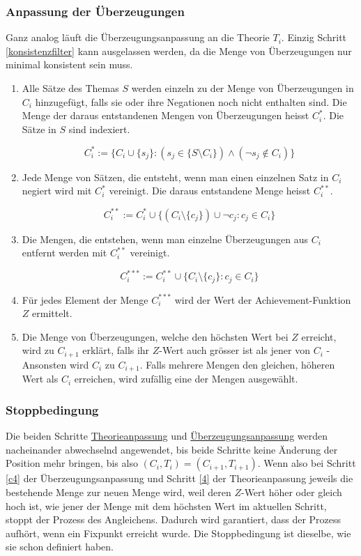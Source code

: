 \documentclass{article}
\begin{document}
\subsubsection{Anpassung der Überzeugungen} \label{C-Anpassung}
Ganz analog läuft die Überzeugungsanpassung an die Theorie $T_i$. Einzig Schritt \ref{konsistenzfilter} kann ausgelassen werden, da die Menge von Überzeugungen nur minimal konsistent sein muss.
\begin{enumerate}
    \item \label{c1} Alle Sätze des Themas $S$ werden einzeln zu der Menge von Überzeugungen in $C_i$ hinzugefügt, falls sie oder ihre Negationen noch nicht enthalten sind. Die Menge der daraus entstandenen Mengen von Überzeugungen heisst $C_i^*$. Die Sätze in $S$ sind indexiert.
    
    $$ 
    C_i^*:= \{ C_i \cup \{s_j\}: (s_j \in \{ S \setminus C_i \}) \land (\neg s_j \not\in C_i) \}
    $$
    
    \item \label{c1.1} Jede Menge von Sätzen, die entsteht, wenn man einen einzelnen Satz in $C_i$ negiert wird mit $C_i^*$ vereinigt. Die daraus entstandene Menge heisst $C_i^{**}$.
    
    $$
    C_i^{**}:= C_i^* \cup \{ (C_i \setminus \{c_j\}) \cup \neg c_j: c_j \in C_i\}
    $$
    
    \item \label{c2} Die Mengen, die entstehen, wenn man einzelne Überzeugungen aus $C_i$ entfernt werden mit $C_i^{**}$ vereinigt.
    
    $$
    C_i^{***}:= C_i^{**} \cup \{ C_i \setminus \{c_j\}: c_j \in C_i\}
    $$
    
    \item \label{c3} Für jedes Element der Menge $C_i^{***}$ wird der Wert der Achievement-Funktion $Z$ ermittelt.
    \item \label{c4}Die Menge von Überzeugungen, welche den höchsten Wert bei $Z$ erreicht, wird zu $C_{i+1}$ erklärt, falls ihr $Z$-Wert auch grösser ist als jener von $C_i$ - Ansonsten wird $C_i$ zu $C_{i+1}$. Falls mehrere Mengen den gleichen, höheren Wert als $C_i$ erreichen, wird zufällig eine der Mengen ausgewählt.\footnotemark[\value{footnote}]
\end{enumerate}

\subsubsection{Stoppbedingung}
Die beiden Schritte \hyperref[T-Anpassung]{Theorieanpassung} und \hyperref[C-Anpassung]{Überzeugungsanpassung} werden nacheinander abwechselnd angewendet, bis beide Schritte keine Änderung der Position mehr bringen, bis also $(C_i, T_i) = (C_{i+1}, T_{i+1})$. Wenn also bei Schritt \ref{c4} der Überzeugungsanpassung und Schritt \ref{4} der Theorieanpassung jeweils die bestehende Menge zur neuen Menge wird, weil deren $Z$-Wert höher oder gleich hoch ist, wie jener der Menge mit dem höchsten Wert im aktuellen Schritt, stoppt der Prozess des Angleichens. Dadurch wird garantiert, dass der Prozess aufhört, wenn ein Fixpunkt erreicht wurde. Die Stoppbedingung ist dieselbe, wie \autocite[S. 450]{beisbart_making_2021} sie schon definiert haben.
\end{document}
